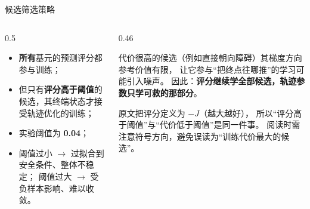\begin{frame}{候选筛选策略}
  \small
  \begin{columns}[t]
    \begin{column}{0.5\textwidth}
      \begin{paperfinding}[原文的描述]
        \footnotesize
        \begin{itemize}\tight
          \item \textbf{所有}基元的预测评分都参与训练；
          \item 但只有\textbf{评分高于阈值}的候选，其终端状态才接受轨迹优化的训练；
          \item 实验阈值为 \textbf{0.04}；
          \item 阈值过小 $\to$ 过拟合到安全条件、整体不稳定；
                阈值过大 $\to$ 受负样本影响、难以收敛。
        \end{itemize}
      \end{paperfinding}
    \end{column}
    \begin{column}{0.46\textwidth}
      \begin{reading}[候选筛选的作用]
        \small
        代价很高的候选（例如直接朝向障碍）其梯度方向参考价值有限，
        让它参与“把终点往哪推”的学习可能引入噪声。
        因此：\textbf{评分继续学全部候选，轨迹参数只学可救的那部分}。
      \end{reading}
      \begin{reading}[记号方向的注意事项]
        \scriptsize
        原文把评分定义为 $-J$（越大越好），
        所以“评分高于阈值”与“代价低于阈值”是同一件事。
        阅读时需注意符号方向，避免误读为“训练代价最大的候选”。
      \end{reading}
    \end{column}
  \end{columns}
\end{frame}

